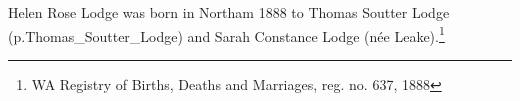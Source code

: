 
Helen Rose Lodge was born in Northam 1888 to Thomas Soutter Lodge (p.{Thomas_Soutter_Lodge}) and Sarah Constance Lodge (n\'{e}e Leake).\footnote{WA Registry of Births, Deaths and Marriages, reg. no. 637, 1888}
